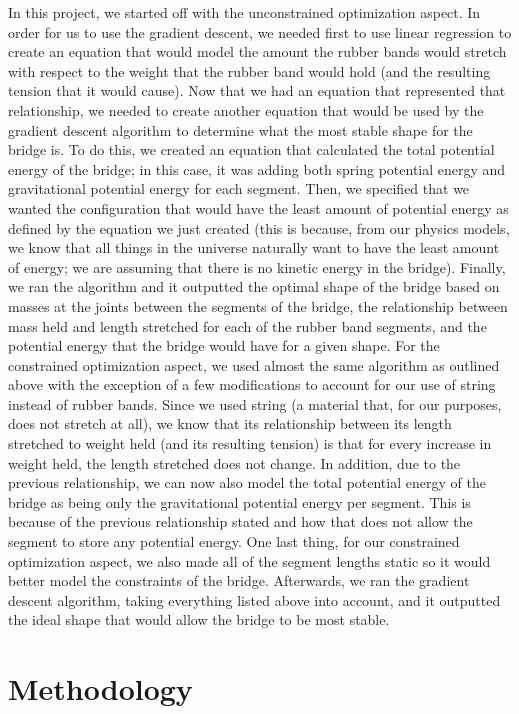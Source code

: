 \documentclass[10pt,letterpaper,onecolumn,report]{tau-class/tau}
\begin{document}
    In this project, we started off with the unconstrained optimization aspect. In order for us to use the gradient descent, we needed first to use linear regression to create an equation that would model the amount the rubber bands would stretch with respect to the weight that the rubber band would hold (and the resulting tension that it would cause). Now that we had an equation that represented that relationship, we needed to create another equation that would be used by the gradient descent algorithm to determine what the most stable shape for the bridge is. To do this, we created an equation that calculated the total potential energy of the bridge; in this case, it was adding both spring potential energy and gravitational potential energy for each segment. Then, we specified that we wanted the configuration that would have the least amount of potential energy as defined by the equation we just created (this is because, from our physics models, we know that all things in the universe naturally want to have the least amount of energy; we are assuming that there is no kinetic energy in the bridge). Finally, we ran the algorithm and it outputted the optimal shape of the bridge based on masses at the joints between the segments of the bridge, the relationship between mass held and length stretched for each of the rubber band segments, and the potential energy that the bridge would have for a given shape. For the constrained optimization aspect, we used almost the same algorithm as outlined above with the exception of a few modifications to account for our use of string instead of rubber bands. Since we used string (a material that, for our purposes, does not stretch at all), we know that its relationship between its length stretched to weight held (and its resulting tension) is that for every increase in weight held, the length stretched does not change. In addition, due to the previous relationship, we can now also model the total potential energy of the bridge as being only the gravitational potential energy per segment. This is because of the previous relationship stated and how that does not allow the segment to store any potential energy. One last thing, for our constrained optimization aspect, we also made all of the segment lengths static so it would better model the constraints of the bridge. Afterwards, we ran the gradient descent algorithm, taking everything listed above into account, and it outputted the ideal shape that would allow the bridge to be most stable.

\section{Methodology}
\end{document}
